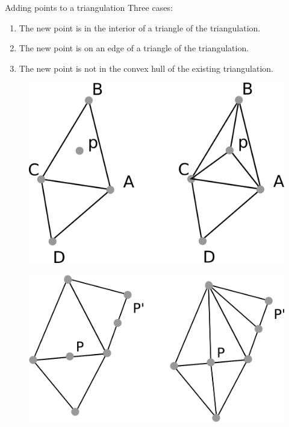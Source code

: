 \documentclass[18pt]{beamer}
\begin{document}
\begin{frame}{Adding points to a triangulation}
Three cases:

\begin{enumerate}
\item<1-> The new point is in the interior of a triangle of the triangulation.
\item<2-> The new point is on an edge of a triangle of the triangulation.
\item<3-> The new point is not in the convex hull of the existing triangulation.
\end{enumerate}

\begin{overprint}
  \begin{figure}
\centering
\includegraphics[scale=0.8]{adding}
\end{figure}
  
  \begin{figure}
\centering
\includegraphics[scale=0.8]{adding2}
\end{figure}
  

\end{overprint}
\end{frame}
\end{document}
